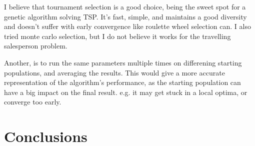 \documentclass[11pt]{scrartcl} %
\begin{document}
I believe that tournament selection is a good choice, being the sweet spot for a genetic algorithm solving TSP. It's fast, simple, and maintains a good diversity and doesn't suffer with early convergence like roulette wheel selection can\cite{genetic_algorithm_afternoon}.
I also tried monte carlo selection, but I do not believe it works for the travelling salesperson problem.

Another, is to run the same parameters multiple times on differening starting populations, and averaging the results. This would give a more accurate representation of the algorithm's performance, as the starting population can have a big impact on the final result. e.g. it may get stuck in a local optima, or converge too early.
\section{Conclusions}

\printbibliography
\end{document}
